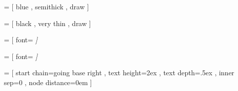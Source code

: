 \newcommand{\drawMiniBox}[4]{
  +(#2 * .2em, 0) --
  +(#2 * .2em, 1ex) --
  +(#1 * .2em, 1ex) --
  +(#1 * .2em, 1.5ex) --
  +(#3 * .2em, 1.5ex) --
  +(#3 * .2em, .5ex) --
  +(#4 * .2em, .5ex) --
  +(#4 * .2em, 0) --
  cycle
}

\newcommand{\minibox}[5][]{%
  \begin{tikzpicture}[baseline=0pt]
  \path [mini layout box, #1]
    (0, 0) \drawMiniBox{#2}{#3}{#4}{#5};
  \end{tikzpicture}}

\newcommand{\miniboxA}{\minibox{-1}{0}{3}{3}}
\newcommand{\miniboxB}{\minibox{0}{0}{3}{3}}
\newcommand{\miniboxC}{\minibox{1}{0}{3}{3}}

\newcommand{\minirect}{\hbox to 9pt{\drawrect[thin,scale=0.3,black]{0pt, 15pt}{26pt, -5pt}{0pt}}}


  = [ blue
    , semithick
    , draw
    ]

  = [ black
    , very thin
    , draw
    ]

  = [ font=\small\it
    ]

  = [ font=\small\it
    ]


\newcommand{\selectCodeFont}{\sf\small}

\newcommand{\selectKeywordFont}{\bfseries}

\newcommand{\selectStringLitFont}{\tt}

\newcommand{\selectIdentifierFont}{\relax}

\newcommand{\selectOperatorFont}{\tt}

\newcommand{\tokenHeight}{2ex}

\newcommand{\tokenDepth}{.5ex}

%

  = [ start chain=going base right
    , text height=\tokenHeight
    , text depth=\tokenDepth
    , inner sep=0
    , node distance=0em
    ]

